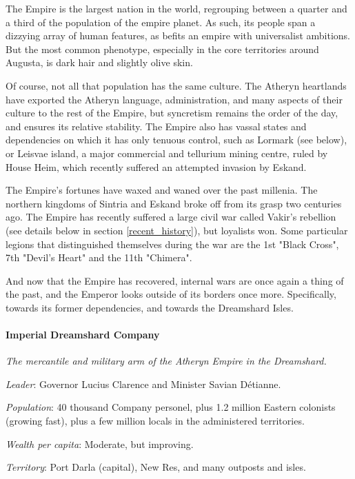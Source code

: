 The Empire is the largest nation in the world, regrouping between a quarter and a third of the population of the empire planet. As such, its people span a dizzying array of human features, as befits an empire with universalist ambitions. But the most common phenotype, especially in the core territories around Augusta, is dark hair and slightly olive skin.

Of course, not all that population has the same culture. The Atheryn heartlands have exported the Atheryn language, administration, and many aspects of their culture to the rest of the Empire, but syncretism remains the order of the day, and ensures its relative stability. The Empire also has vassal states and dependencies on which it has only tenuous control, such as Lormark (see below), or Leisvae island, a major commercial and tellurium mining centre, ruled by House Heim, which recently suffered an attempted invasion by Eskand.


The Empire's fortunes have waxed and waned over the past millenia. The northern kingdoms of Sintria and Eskand broke off from its grasp two centuries ago. The Empire has recently suffered a large civil war called Vakir's rebellion (see details below in section \ref{recent_history}), but loyalists won. Some particular legions that distinguished themselves during the war are the 1st "Black Cross", 7th "Devil's Heart" and the 11th "Chimera".


And now that the Empire has recovered, internal wars are once again a thing of the past, and the Emperor looks outside of its borders once more. Specifically, towards its former dependencies, and towards the Dreamshard Isles. 




\paragraph{Imperial Dreamshard Company}

\textit{The mercantile and military arm of the Atheryn Empire in the Dreamshard.}

\textit{Leader}: Governor Lucius Clarence and Minister Savian Détianne.

\textit{Population}: 40 thousand Company personel, plus 1.2 million Eastern colonists (growing fast), plus a few million locals in the administered territories.

\textit{Wealth per capita}: Moderate, but improving.

\textit{Territory}: Port Darla (capital), New Res, and many outposts and isles.

